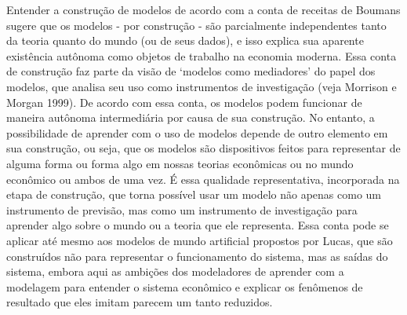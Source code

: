 \documentclass[12pt]{article}
\begin{document}
Entender a construção de modelos de acordo com a conta de receitas de Boumans sugere que os modelos - por construção - são parcialmente independentes tanto da teoria quanto do mundo (ou de seus dados), e isso explica sua aparente existência autônoma como objetos de trabalho na economia moderna. Essa conta de construção faz parte da visão de ‘modelos como mediadores’ do papel dos modelos, que analisa seu uso como instrumentos de investigação (veja Morrison e Morgan 1999). De acordo com essa conta, os modelos podem funcionar de maneira autônoma intermediária por causa de sua construção. No entanto, a possibilidade de aprender com o uso de modelos depende de outro elemento em sua construção, ou seja, que os modelos são dispositivos feitos para representar de alguma forma ou forma algo em nossas teorias econômicas ou no mundo econômico ou ambos de uma vez. É essa qualidade representativa, incorporada na etapa de construção, que torna possível usar um modelo não apenas como um instrumento de previsão, mas como um instrumento de investigação para aprender algo sobre o mundo ou a teoria que ele representa. Essa conta pode se aplicar até mesmo aos modelos de mundo artificial propostos por Lucas, que são construídos não para representar o funcionamento do sistema, mas as saídas do sistema, embora aqui as ambições dos modeladores de aprender com a modelagem para entender o sistema econômico e explicar os fenômenos de resultado que eles imitam parecem um tanto reduzidos.
\end{document}
